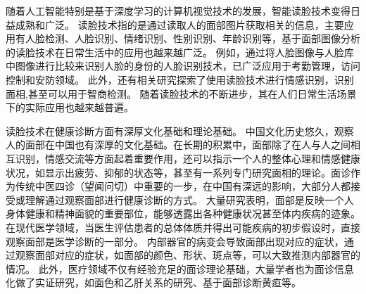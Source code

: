 % 
随着人工智能特别是基于深度学习的计算机视觉技术的发展，智能读脸技术变得日益成熟和广泛。
读脸技术指的是通过读取人的面部图片获取相关的信息，主要应用有人脸检测、人脸识别、情绪识别、性别识别、年龄识别等，基于面部图像分析的读脸技术在日常生活中的应用也越来越广泛。
例如，通过将人脸图像与人脸库中图像进行比较来识别人脸的身份的人脸识别技术\cite{Zhang2016Joint, Schroff2015FaceNet}，已广泛应用于考勤管理\cite{surekha2017attendance}，访问控制\cite{atick2000continuous}和安防领域\cite{liu2005ibotguard}。
此外，还有相关研究探索了使用读脸技术进行情感识别\cite{corneanu2016survey}，识别面相\cite{Li2007Online, Tempark2012Chinese},甚至可以用于智商检测\cite{Kleisner2014Perceived}。
随着读脸技术的不断进步，其在人们日常生活场景下的实际应用也越来越普遍。

读脸技术在健康诊断方面有深厚文化基础和理论基础。
中国文化历史悠久，观察人的面部在中国也有深厚的文化基础。在长期的积累中，面部除了在人与人之间相互识别，情感交流等方面起着重要作用，还可以指示一个人的整体心理和情感健康状况，如显示出疲劳、抑郁的状态等，甚至有一系列专门研究面相的理论。面诊作为传统中医四诊（望闻问切）中重要的一步，在中国有深远的影响，大部分人都接受或理解通过观察面部进行健康诊断的方式。
大量研究表明，面部是反映一个人身体健康和精神面貌的重要部位，能够透露出各种健康状况甚至体内疾病的迹象。
在现代医学领域，当医生评估患者的总体体质并得出可能疾病的初步假设时，直接观察面部是医学诊断的一部分\cite{Clifford2006Shortliffe}。
内部器官的病变会导致面部出现对应的症状，通过观察面部对应的症状，如面部的颜色、形状、斑点等，可以大致推测内部器官的情况\cite{杨淑芳2002伤寒六经辨证初探}。
此外，医疗领域不仅有经验充足的面诊理论基础，大量学者也为面诊信息化做了实证研究，如面色和乙肝关系的研究\cite{杨宏志2007慢性乙型肝炎肝硬化中医面部五色诊断与临床病理的相关性研究, Li2008Therapeutic}、基于面部诊断黄疸\cite{艾英1998黄疸病人面部色泽定量实验研究}等。


% 


